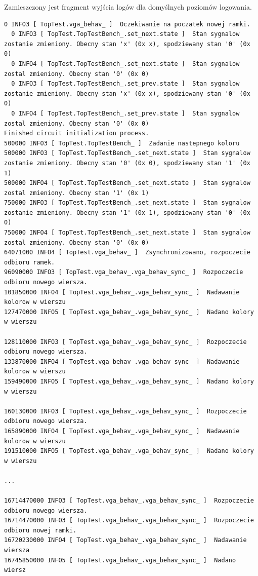\documentclass[a4paper,12pt]{article}
\begin{document}
Zamieszczony jest fragment wyjścia logów dla domyślnych poziomów logowania.
\begin{lstlisting}[label=Vga_output,caption=Vga logs output]
  0 INFO3 [ TopTest.vga_behav_ ]  Oczekiwanie na poczatek nowej ramki.
  0 INFO3 [ TopTest.TopTestBench_.set_next.state ]  Stan sygnalow zostanie zmieniony. Obecny stan 'x' (0x x), spodziewany stan '0' (0x 0)
  0 INFO4 [ TopTest.TopTestBench_.set_next.state ]  Stan sygnalow zostal zmieniony. Obecny stan '0' (0x 0)
  0 INFO3 [ TopTest.TopTestBench_.set_prev.state ]  Stan sygnalow zostanie zmieniony. Obecny stan 'x' (0x x), spodziewany stan '0' (0x 0)
  0 INFO4 [ TopTest.TopTestBench_.set_prev.state ]  Stan sygnalow zostal zmieniony. Obecny stan '0' (0x 0)
Finished circuit initialization process.
500000 INFO3 [ TopTest.TopTestBench_ ]  Zadanie nastepnego koloru
500000 INFO3 [ TopTest.TopTestBench_.set_next.state ]  Stan sygnalow zostanie zmieniony. Obecny stan '0' (0x 0), spodziewany stan '1' (0x 1)
500000 INFO4 [ TopTest.TopTestBench_.set_next.state ]  Stan sygnalow zostal zmieniony. Obecny stan '1' (0x 1)
750000 INFO3 [ TopTest.TopTestBench_.set_next.state ]  Stan sygnalow zostanie zmieniony. Obecny stan '1' (0x 1), spodziewany stan '0' (0x 0)
750000 INFO4 [ TopTest.TopTestBench_.set_next.state ]  Stan sygnalow zostal zmieniony. Obecny stan '0' (0x 0)
64071000 INFO4 [ TopTest.vga_behav_ ]  Zsynchronizowano, rozpoczecie odbioru ramek.
96090000 INFO3 [ TopTest.vga_behav_.vga_behav_sync_ ]  Rozpoczecie odbioru nowego wiersza.
101850000 INFO4 [ TopTest.vga_behav_.vga_behav_sync_ ]  Nadawanie kolorow w wierszu
127470000 INFO5 [ TopTest.vga_behav_.vga_behav_sync_ ]  Nadano kolory w wierszu

128110000 INFO3 [ TopTest.vga_behav_.vga_behav_sync_ ]  Rozpoczecie odbioru nowego wiersza.
133870000 INFO4 [ TopTest.vga_behav_.vga_behav_sync_ ]  Nadawanie kolorow w wierszu
159490000 INFO5 [ TopTest.vga_behav_.vga_behav_sync_ ]  Nadano kolory w wierszu

160130000 INFO3 [ TopTest.vga_behav_.vga_behav_sync_ ]  Rozpoczecie odbioru nowego wiersza.
165890000 INFO4 [ TopTest.vga_behav_.vga_behav_sync_ ]  Nadawanie kolorow w wierszu
191510000 INFO5 [ TopTest.vga_behav_.vga_behav_sync_ ]  Nadano kolory w wierszu

...

16714470000 INFO3 [ TopTest.vga_behav_.vga_behav_sync_ ]  Rozpoczecie odbioru nowego wiersza.
16714470000 INFO3 [ TopTest.vga_behav_.vga_behav_sync_ ]  Rozpoczecie odbioru nowej ramki.
16720230000 INFO4 [ TopTest.vga_behav_.vga_behav_sync_ ]  Nadawanie wiersza
16745850000 INFO5 [ TopTest.vga_behav_.vga_behav_sync_ ]  Nadano  wiersz


\end{lstlisting}
\end{document}
